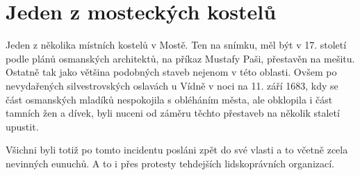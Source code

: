 
\chapter{Jeden z mosteckých kostelů}

Jeden z několika místních kostelů v Mostě. Ten na snímku, měl být v 17. století
podle plánů osmanských architektů, na příkaz Mustafy Paši, přestavěn na mešitu.
Ostatně tak jako většina podobných staveb nejenom v této oblasti. Ovšem po
nevydařených silvestrovských oslavách u Vídně v noci na 11. září 1683, kdy se
část osmanských mladíků nespokojila s obléháním města, ale obklopila i část
tamních žen a dívek, byli nuceni od záměru těchto přestaveb na několik staletí
upustit.

Všichni byli totiž po tomto incidentu posláni zpět do své vlasti a to včetně
zcela nevinných eunuchů. A to i přes protesty tehdejších lidskoprávních
organizací.

